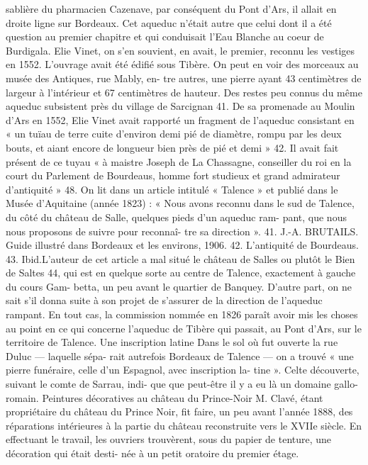 \documentclass[a4paper,11pt]{book}
\begin{document}
sablière du pharmacien Cazenave, par conséquent du Pont
d'Ars, il allait en droite ligne sur Bordeaux.
Cet aqueduc n'était autre que celui dont il a été question
au premier chapitre et qui conduisait l'Eau Blanche au
coeur de Burdigala. Elie Vinet, on s'en souvient, en
avait, le premier, reconnu les vestiges en 1552.
L'ouvrage avait été édifié sous Tibère. On peut en
voir des morceaux au musée des Antiques, rue Mably, en-
tre autres, une pierre ayant 43 centimètres de largeur à
l'intérieur et 67 centimètres de hauteur.
Des restes peu connus du même aqueduc subsistent
près du village de Sarcignan 41.
De sa promenade au Moulin d'Ars en 1552, Elie Vinet
avait rapporté un fragment de l'aqueduc consistant en
« un tuïau de terre cuite d'environ demi pié de diamètre,
rompu par les deux bouts, et aiant encore de longueur
bien près de pié et demi » 42. Il avait fait présent de
ce tuyau « à maistre Joseph de La Chassagne, conseiller
du roi en la court du Parlement de Bourdeaus, homme
fort studieux et grand admirateur d'antiquité » 48.
On lit dans un article intitulé « Talence » et publié dans
le Musée d'Aquitaine (année 1823) :
« Nous avons reconnu dans le sud de Talence, du côté
du château de Salle, quelques pieds d'un aqueduc ram-
pant, que nous nous proposons de suivre pour reconnaî-
tre sa direction ».
41. J.-A. BRUTAILS. Guide illustré dans Bordeaux et les environs, 1906.
42. L'antiquité de Bourdeaus.
43. Ibid.L'auteur de cet article a mal situé le château de Salles
ou plutôt le Bien de Saltes 44, qui est en quelque sorte
au centre de Talence, exactement à gauche du cours Gam-
betta, un peu avant le quartier de Banquey.
D'autre part, on ne sait s'il donna suite à son projet
de s'assurer de la direction de l'aqueduc rampant. En tout
cas, la commission nommée en 1826 paraît avoir mis les
choses au point en ce qui concerne l'aqueduc de Tibère
qui passait, au Pont d'Ars, sur le territoire de Talence.
Une inscription latine
Dans le sol où fut ouverte la rue Duluc — laquelle sépa-
rait autrefois Bordeaux de Talence — on a trouvé « une
pierre funéraire, celle d'un Espagnol, avec inscription la-
tine ». Celte découverte, suivant le comte de Sarrau, indi-
que que peut-être il y a eu là un domaine gallo-romain.
Peintures décoratives au château du Prince-Noir
M. Clavé, étant propriétaire du château du Prince Noir,
fit faire, un peu avant l'année 1888, des réparations
intérieures à la partie du château reconstruite vers le XVIIe
siècle. En effectuant le travail, les ouvriers trouvèrent,
sous du papier de tenture, une décoration qui était desti-
née à un petit oratoire du premier étage.
\end{document}
